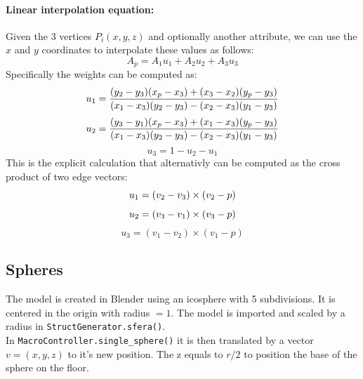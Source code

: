 \documentclass{article}
\begin{document}
\paragraph{Linear interpolation equation:} Given the 3 vertices $P_i(x,y,z)$ and optionally another attribute, we can use the $x$ and $y$ coordinates to interpolate these values as follows:
$$A_p = A_1u_1 + A_2u_2 + A_3u_3$$
Specifically the weights can be computed as:
$$u_1 = \frac{(y_2 - y_3)(x_p - x_3) + (x_3 - x_2)(y_p - y_3)}{(x_1 - x_3)(y_2 - y_3) - (x_2 - x_3)(y_1 - y_3)} \\$$
$$u_2 = \frac{(y_3 - y_1)(x_p - x_3) + (x_1 - x_3)(y_p - y_3)}{(x_1 - x_3)(y_2 - y_3) - (x_2 - x_3)(y_1 - y_3)} \\$$
$$u_3 = 1 - u_2 - u_1$$
This is the explicit calculation that alternativly can be computed as the cross product of two edge vectors:
$$u_1 = (v_2 - v_3) \times (v_2 - p) \\$$
$$u_2 = (v_3 - v_1) \times (v_3 - p) \\$$
$$u_3 = (v_1 - v_2) \times (v_1 - p)$$

\newpage

\subsection{Spheres}\label{subsec:Spheres}

The model is created in Blender using an icosphere with 5 subdivisions. It is centered in the origin with radius $=1$.
The model is imported and scaled by a radius in \texttt{StructGenerator.sfera()}.
\\[.5cm]
In \texttt{MacroController.single\_sphere()} it is then translated by a vector $v = (x, y, z)$ to it's new position. The z equals to $r/2$ to position the base of the sphere on the floor.
\end{document}
